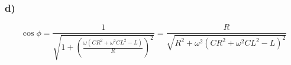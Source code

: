 \documentclass[../homework.tex]{subfiles}
\begin{document}
\subsubsection*{d)}
\begin{equation*}
    \cos{\phi} = \frac{1}{\sqrt{1 + \left( \frac{\omega(CR^2 + \omega^2 C L^2 - L)}{R} \right)^2}} = \frac{R}{\sqrt{R^2 + \omega^2 (CR^2 + \omega^2 C L^2 - L)^2}}
\end{equation*}
\end{document}
